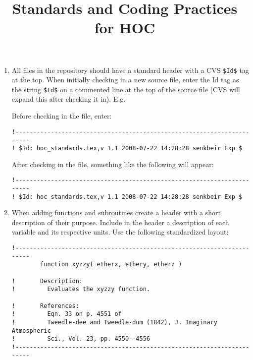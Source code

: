 \documentclass[letterpaper,12pt]{article}
\begin{document}
\title{\textbf{Standards and Coding Practices for HOC}}
\author{}

\maketitle

\flushleft
\begin{enumerate}
\item All files in the repository should have a standard header with a CVS 
\texttt{\$Id\$} tag at the top.
\newline
When initially checking in a new source file, enter the Id tag as 
the string \texttt{\$Id\$} on a commented line at the top of the source file
 (CVS will expand this after checking it in).
E.g. \newline

Before checking in the file, enter:
\begin{verbatim}
!-----------------------------------------------------------------------
! $Id: hoc_standards.tex,v 1.1 2008-07-22 14:28:28 senkbeir Exp $

\end{verbatim}

\bigskip

After checking in the file, something like the following will appear:
\begin{verbatim}
!-----------------------------------------------------------------------
! $Id: hoc_standards.tex,v 1.1 2008-07-22 14:28:28 senkbeir Exp $

\end{verbatim}

\item When adding functions and subroutines create a header with a short 
description of their purpose.  Include in the header a description of 
each variable and its respective units.  Use the following standardized
layout: 

\begin{verbatim}
!-----------------------------------------------------------------------
        function xyzzy( etherx, ethery, etherz )

!       Description:
!         Evaluates the xyzzy function. 

!       References:
!         Eqn. 33 on p. 4551 of  
!         Tweedle-dee and Tweedle-dum (1842), J. Imaginary Atmospheric 
!         Sci., Vol. 23, pp. 4550--4556
!-----------------------------------------------------------------------


\end{verbatim}
\end{enumerate}
\end{document}
